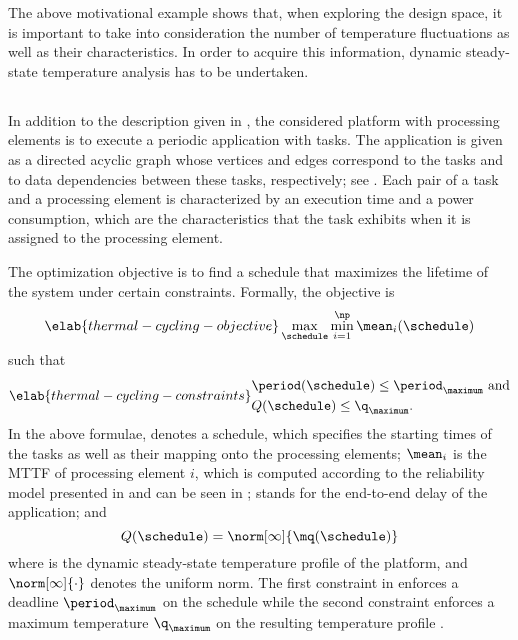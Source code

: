 The above motivational example shows that, when exploring the design space, it
is important to take into consideration the number of temperature fluctuations
as well as their characteristics. In order to acquire this information, dynamic
steady-state temperature analysis has to be undertaken.

\subsection{\problemtitle}

In addition to the description given in , the considered
platform with \np processing elements is to execute a periodic application with
\nt tasks. The application is given as a directed acyclic graph whose vertices
and edges correspond to the tasks and to data dependencies between these tasks,
respectively; see . Each pair of a task and a
processing element is characterized by an execution time and a power
consumption, which are the characteristics that the task exhibits when it is
assigned to the processing element.

The optimization objective is to find a schedule that maximizes the lifetime of
the system under certain constraints. Formally, the objective is
\begin{equation} \elab{thermal-cycling-objective}
  \max_{\schedule} \min_{i = 1}^\np \mean_i(\schedule)
\end{equation}
such that
\begin{align} \elab{thermal-cycling-constraints}
  \begin{split}
    & \period(\schedule) \leq \period_\maximum \text{ and} \\
    & Q(\schedule) \leq \q_\maximum.
  \end{split}
\end{align}
In the above formulae, \schedule denotes a schedule, which specifies the
starting times of the tasks as well as their mapping onto the processing
elements; $\mean_i$ is the \ac{MTTF} of processing element $i$, which is
computed according to the reliability model presented in
 and can be seen in
; \period stands for the end-to-end delay of the
application; and
\[
  Q(\schedule) = \norm[\infty]{\mq(\schedule)}
\]
where \mq is the dynamic steady-state temperature profile of the platform, and
$\norm[\infty]{\cdot}$ denotes the uniform norm. The first constraint in
 enforces a deadline $\period_\maximum$ on the
schedule while the second constraint enforces a maximum temperature
$\q_\maximum$ on the resulting temperature profile \mq.

